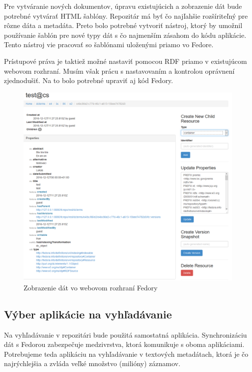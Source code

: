 \documentclass[thesis=M,slovak]{FITthesis}[2013/05/06]
\begin{document}
Pre vytváranie nových dokumentov, úpravu existujúcich a zobrazenie dát bude potrebné vytvárať HTML šablóny. Repozitár má byť čo najľahšie rozšíriteľný pre rôzne dáta a metadáta. Preto bolo potrebné vytvoriť nástroj, ktorý by umožnil používanie šablón pre nové typy dát s čo najmenším zásahom do kódu aplikácie. Tento nástroj vie pracovať so šablónami uloženými priamo vo Fedore.

Prístupové práva je taktiež možné nastaviť pomocou RDF priamo v existujúcom webovom rozhraní. Musím však prácu s nastavovaním a kontrolou oprávnení zjednodušiť. Na to bolo potrebné upraviť aj kód Fedory.

\begin{figure}\centering
	\includegraphics[width=1.0\textwidth]{fedora/dcterms_vo_Fedore.png}
 	\caption[Zobrazenie dát vo webovom rozhraní Fedory]{Zobrazenie dát vo webovom rozhraní Fedory}\label{graphics:fedora}
\end{figure}

\subsection{Výber aplikácie na vyhľadávanie}
Na vyhľadávanie v repozitári bude použitá samostatná aplikácia. Synchronizáciu dát s Fedorou zabezpečuje medzivrstva, ktorá komunikuje s oboma aplikáciami. Potrebujeme teda aplikáciu na vyhľadávanie v textových metadátach, ktorá je čo najrýchlejšia a zvláda veľké množstvo (milióny) záznamov.
\end{document}
